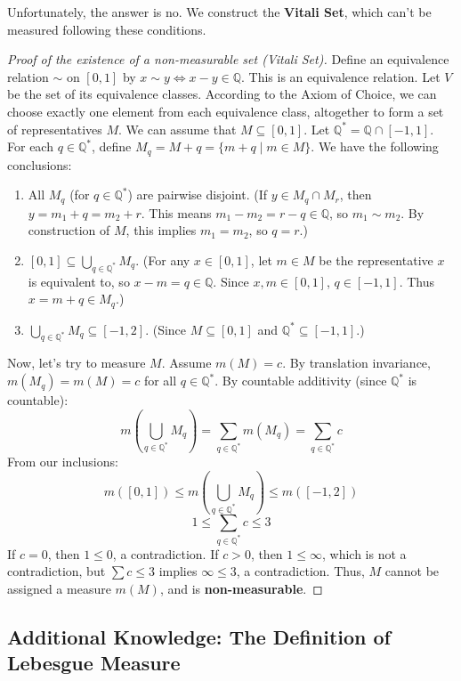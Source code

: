 Unfortunately, the answer is no. We construct the \textbf{Vitali Set}, which can’t be measured following these conditions.

\begin{proof}[Proof of the existence of a non-measurable set (Vitali Set)]
Define an equivalence relation $\sim$ on $[0,1]$ by $x \sim y \iff x-y \in \mathbb{Q}$.
This is an equivalence relation. Let $V$ be the set of its equivalence classes.
According to the Axiom of Choice, we can choose exactly one element from each equivalence class, altogether to form a set of representatives $M$. We can assume that $M \subseteq [0,1]$.
Let $\mathbb{Q}^* = \mathbb{Q} \cap [-1, 1]$. For each $q \in \mathbb{Q}^*$, define $M_q = M+q = \{m+q \mid m \in M\}$.
We have the following conclusions:
\begin{enumerate}
    \item All $M_q$ (for $q \in \mathbb{Q}^*$) are pairwise disjoint. (If $y \in M_q \cap M_r$, then $y = m_1+q = m_2+r$. This means $m_1 - m_2 = r-q \in \mathbb{Q}$, so $m_1 \sim m_2$. By construction of $M$, this implies $m_1=m_2$, so $q=r$.)
    \item $[0,1] \subseteq \bigcup_{q \in \mathbb{Q}^*} M_q$. (For any $x \in [0,1]$, let $m \in M$ be the representative $x$ is equivalent to, so $x-m = q \in \mathbb{Q}$. Since $x,m \in [0,1]$, $q \in [-1,1]$. Thus $x = m+q \in M_q$.)
    \item $\bigcup_{q \in \mathbb{Q}^*} M_q \subseteq [-1, 2]$. (Since $M \subseteq [0,1]$ and $\mathbb{Q}^* \subseteq [-1,1]$.)
\end{enumerate}
Now, let's try to measure $M$. Assume $m(M) = c$.
By translation invariance, $m(M_q) = m(M) = c$ for all $q \in \mathbb{Q}^*$.
By countable additivity (since $\mathbb{Q}^*$ is countable):
$$ m\left(\bigcup_{q \in \mathbb{Q}^*} M_q\right) = \sum_{q \in \mathbb{Q}^*} m(M_q) = \sum_{q \in \mathbb{Q}^*} c $$
From our inclusions:
$$ m([0,1]) \le m\left(\bigcup_{q \in \mathbb{Q}^*} M_q\right) \le m([-1,2]) $$
$$ 1 \le \sum_{q \in \mathbb{Q}^*} c \le 3 $$
If $c = 0$, then $1 \le 0$, a contradiction.
If $c > 0$, then $1 \le \infty$, which is not a contradiction, but $\sum c \le 3$ implies $\infty \le 3$, a contradiction.
Thus, $M$ cannot be assigned a measure $m(M)$, and is \textbf{non-measurable}.
\end{proof}


\subsection*{Additional Knowledge: The Definition of Lebesgue Measure}

